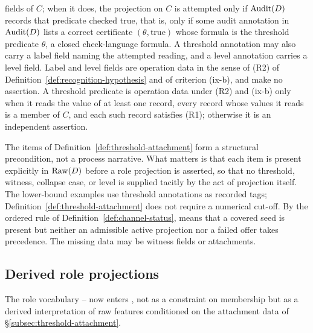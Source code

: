 \begin{definition}
fields of \(C\); when it does, the projection on \(C\) is attempted only if
\(\operatorname{Audit}\!\left(D\right)\) records that predicate checked true, that is, only if some audit annotation in \(\operatorname{Audit}\!\left(D\right)\) lists a correct certificate \((\theta,\mathrm{true})\) whose formula is the threshold predicate \(\theta\), a closed check-language formula. A threshold annotation may
also carry a label field naming the attempted reading, and a level annotation
carries a level field. Label and level fields are operation data in the sense
of (R2) of Definition~\ref{def:recognition-hypothesis} and of criterion (ix-b),
and make no assertion. A threshold predicate is operation data under (R2) and
(ix-b) only when it reads the value of at least one record, every record whose values it reads is a member of \(C\), and each such record satisfies (R1); otherwise
it is an independent assertion.
\end{definition}

\begin{remark}\label{rem:pre-projection}
The items of Definition~\ref{def:threshold-attachment} form a structural
precondition, not a process narrative. What matters is that each item is
present explicitly in \(\operatorname{Raw}\!\left(D\right)\) before a role projection is asserted, so
that no threshold, witness, collapse case, or level is supplied tacitly by
the act of projection itself. The lower-bound examples use threshold
annotations as recorded tags; Definition~\ref{def:threshold-attachment} does
not require a numerical cut-off. By the ordered rule of
Definition~\ref{def:channel-status}, \belowthr{} means that a covered seed is
present but neither an admissible active projection nor a failed offer takes
precedence. The missing data may be witness fields or attachments.
\end{remark}

\subsection{Derived role projections}\label{subsec:derived-role-projections}

The role vocabulary \Pone{}--\Psix{} now enters \FATCD{}, not as a
constraint on membership but as a derived interpretation of raw
features conditioned on the attachment data of
\S\ref{subsec:threshold-attachment}.

